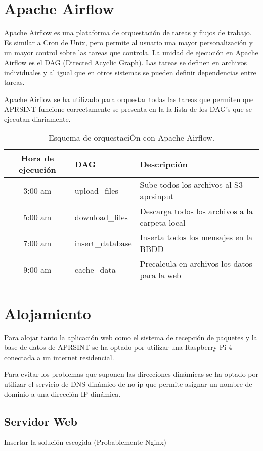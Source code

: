 \section{Apache Airflow}
Apache Airflow es una plataforma de orquestación de tareas y flujos de trabajo. Es similar a Cron de Unix, pero permite al usuario una mayor personalización y un mayor control sobre las tareas que controla. La unidad de ejecución en Apache Airflow es el DAG (Directed Acyclic Graph). Las tareas se definen en archivos individuales y al igual que en otros sistemas se pueden definir dependencias entre tareas.

Apache Airflow se ha utilizado para orquestar todas las tareas que permiten que APRSINT funcione correctamente se presenta en la  la lista de los DAG's que se ejecutan diariamente.

\begin{table}[htbp]
    \centering
    \begin{tabular}{|c|l|l|}
        \hline
        \textbf{Hora de ejecución} & \textbf{DAG} & \textbf{Descripción} \\
        \hline
        3:00 am & upload\_files & Sube todos los archivos al S3 aprsinput \\
        \hline
        5:00 am & download\_files & Descarga todos los archivos a la carpeta local \\
        \hline
        7:00 am & insert\_database & Inserta todos los mensajes en la BBDD \\
		\hline
        9:00 am & cache\_data & Precalcula en archivos los datos para la web \\
        \hline
    \end{tabular}
    \caption{Esquema de orquestaciÓn con Apache Airflow.}
    \label{tab:airflow-sched}
\end{table}

\section{Alojamiento}
Para alojar tanto la aplicación web como el sistema de recepción de paquetes y la base de datos de APRSINT se ha optado por utilizar una Raspberry Pi 4 conectada a un internet residencial. 

Para evitar los problemas que suponen las direcciones dinámicas se ha optado por utilizar el servicio de DNS dinámico de no-ip que permite asignar un nombre de dominio a una dirección IP dinámica. 

\subsection{Servidor Web}
Insertar la solución escogida (Probablemente Nginx)


